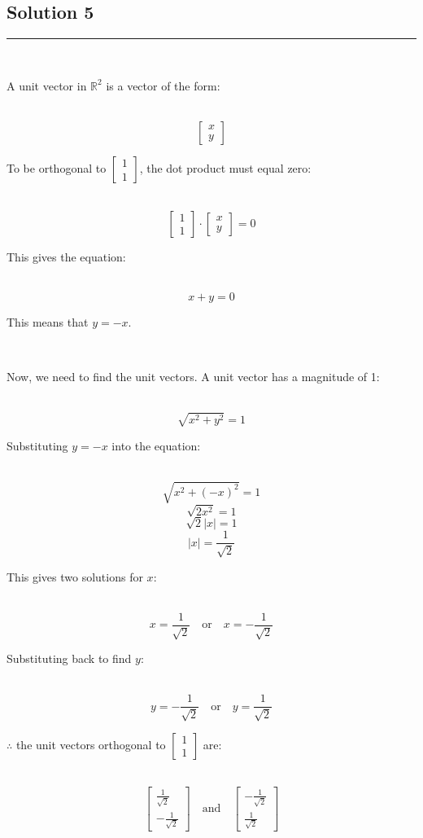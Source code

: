 \documentclass{article}
\begin{document}
\subsection*{Solution 5}
\noindent\rule{\textwidth}{0.4pt}\\
\parbox{\textwidth}{A unit vector in $\mathbb{R}^2$ is a vector of the form:}\\
$$\begin{bmatrix} x \\ y \end{bmatrix}$$
\parbox{\textwidth}{To be orthogonal to $\begin{bmatrix} 1 \\ 1 \end{bmatrix}$, the dot product must equal zero:}\\
$$\begin{bmatrix} 1 \\ 1 \end{bmatrix} \cdot \begin{bmatrix} x \\ y \end{bmatrix} = 0$$
\parbox{\textwidth}{This gives the equation:}\\
$$x + y = 0$$
\parbox{\textwidth}{This means that $y = -x$.}\\
\parbox{\textwidth}{Now, we need to find the unit vectors. A unit vector has a magnitude of 1:}\\
$$\sqrt{x^2 + y^2} = 1$$
\parbox{\textwidth}{Substituting $y = -x$ into the equation:}\\
$$\sqrt{x^2 + (-x)^2} = 1$$
$$\sqrt{2x^2} = 1$$
$$\sqrt{2}|x| = 1$$
$$|x| = \frac{1}{\sqrt{2}}$$
\parbox{\textwidth}{This gives two solutions for $x$:}\\
$$x = \frac{1}{\sqrt{2}} \quad \text{or} \quad x = -\frac{1}{\sqrt{2}}$$
\parbox{\textwidth}{Substituting back to find $y$:}\\
$$y = -\frac{1}{\sqrt{2}} \quad \text{or} \quad y = \frac{1}{\sqrt{2}}$$
\parbox{\textwidth}{$\therefore$ the unit vectors orthogonal to $\begin{bmatrix} 1 \\ 1 \end{bmatrix}$ are:}\\
$$\begin{bmatrix} \frac{1}{\sqrt{2}} \\ -\frac{1}{\sqrt{2}} \end{bmatrix} \quad \text{and} \quad \begin{bmatrix} -\frac{1}{\sqrt{2}} \\ \frac{1}{\sqrt{2}} \end{bmatrix}$$
\end{document}
